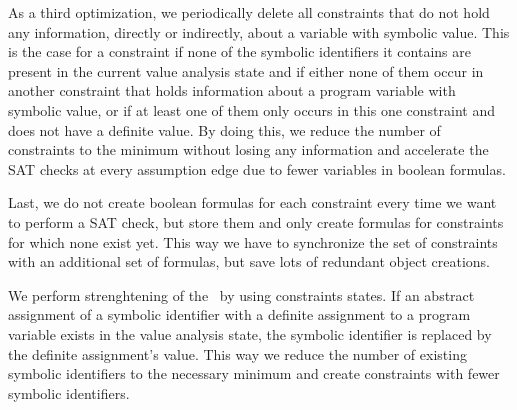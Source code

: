 As a third optimization, we periodically delete all constraints that do not hold any information, directly or indirectly, about a variable with symbolic value.
This is the case for a constraint if none of the symbolic identifiers it contains are present in the current value analysis state and if either none of them occur in another constraint that holds information about a program variable with symbolic value, or if at least one of them only occurs in this one constraint and does not have a definite value.
By doing this, we reduce the number of constraints to the minimum without losing any information and accelerate the SAT checks at every assumption edge due to fewer variables in boolean formulas.

Last, we do not create boolean formulas for each constraint every time we want to perform a SAT check, but store them and only create formulas for constraints for which none exist yet.
This way we have to synchronize the set of constraints with an additional set of formulas, but save lots of redundant object creations.

We perform strenghtening of the \ by using constraints states.
If an abstract assignment of a symbolic identifier with a definite assignment to a program variable exists in the value analysis state, the symbolic identifier is replaced by the definite assignment's value. This way we reduce the number of existing symbolic identifiers to the necessary minimum and create constraints with fewer symbolic identifiers.
